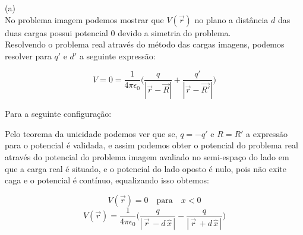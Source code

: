 \documentclass[a4paper,11pt]{exam}
\begin{document}
{\begin{center}
	\end{center}
	
	(a)\\
	\indent No problema imagem podemos mostrar que $V(\vec{r})$ no plano a distância $d$ das duas cargas possui potencial $0$ devido a simetria do problema.
	\\
	\indent Resolvendo o problema real através do método das cargas imagens, podemos resolver para $q'$ e $d'$ a seguinte expressão:
	
	\[ V = 0 =\frac{1}{4 \pi \epsilon_0} \Bigg( \frac{q}{|\vec{r} - \vec{R}|} + \frac{q'}{|\vec{r} - \vec{R'}|} \Bigg)\]
	
	\indent Para a seguinte configuração:
	\begin{center}
	\end{center}
	\indent Pelo teorema da unicidade podemos ver que se, $q = -q'$ e $R = R'$ a expressão para o potencial é validada, e assim podemos obter o potencial do problema real através do potencial do problema imagem avaliado no semi-espaço do lado em que a carga real é situado, e o potencial do lado oposto é nulo, pois não exite caga e o potencial é contínuo, equalizando isso obtemos:
	
	\[V(\vec{r}) = 0 \quad \text{para} \quad x < 0 \]
	\[V(\vec{r}) = \frac{1}{4 \pi \epsilon_0} \Bigg( \frac{q}{|\,\vec{r}\, - d\,\hat{x}\,|} - \frac{q}{|\,\vec{r}\, + d\,\hat{x}\,|} \Bigg)\]
	
}
\end{document}
